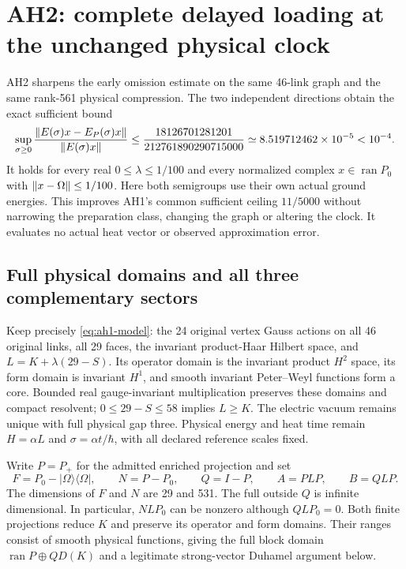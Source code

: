 \section{AH2: complete delayed loading at the unchanged physical clock\workstar}
AH2 sharpens the early omission estimate on the same 46-link graph and the same rank-561 physical compression. The two independent directions obtain the exact sufficient bound
\begin{equation}
 \sup_{\sigma\ge0}
 \frac{\left\lVert E(\sigma)x-E_P(\sigma)x\right\rVert}{\left\lVert E(\sigma)x\right\rVert}
 \le \frac{18126701281201}{212761890290715000}
 \simeq 8.519712462\times10^{-5}<10^{-4}.
 \label{eq:ah2-result}
\end{equation}
It holds for every real $0\le\lambda\le1/100$ and every normalized complex $x\in\operatorname{ran}P_0$ with $\left\lVert x-\Omega\right\rVert\le1/100$. Here both semigroups use their own actual ground energies. This improves AH1's common sufficient ceiling $11/5000$ without narrowing the preparation class, changing the graph or altering the clock. It evaluates no actual heat vector or observed approximation error.

\subsection{Full physical domains and all three complementary sectors}
Keep precisely \eqref{eq:ah1-model}: the 24 original vertex Gauss actions on all 46 original links, all 29 faces, the invariant product-Haar Hilbert space, and $L=K+\lambda(29-S)$. Its operator domain is the invariant product $H^2$ space, its form domain is invariant $H^1$, and smooth invariant Peter--Weyl functions form a core. Bounded real gauge-invariant multiplication preserves these domains and compact resolvent; $0\le29-S\le58$ implies $L\ge K$. The electric vacuum remains unique with full physical gap three. Physical energy and heat time remain $H=\alpha L$ and $\sigma=\alpha t/\hbar$, with all declared reference scales fixed.

Write $P=P_+$ for the admitted enriched projection and set
\begin{equation}
 F=P_0-|\Omega\rangle\langle\Omega|,\qquad
 N=P-P_0,\qquad Q=I-P,\qquad A=PLP,\qquad B=QLP.
 \label{eq:ah2-sectors}
\end{equation}
The dimensions of $F$ and $N$ are 29 and 531. The full outside $Q$ is infinite dimensional. In particular, $NLP_0$ can be nonzero although $QLP_0=0$. Both finite projections reduce $K$ and preserve its operator and form domains. Their ranges consist of smooth physical functions, giving the full block domain $\operatorname{ran}P\oplus QD(K)$ and a legitimate strong-vector Duhamel argument below.

